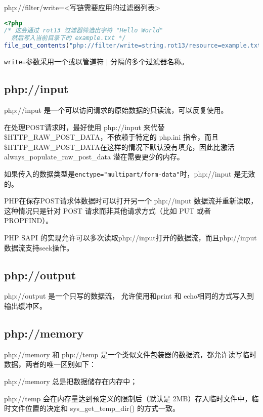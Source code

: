 \begin{example}
php://filter/write=<写链需要应用的过滤器列表>
\begin{lstlisting}[language=PHP]
<?php
/* 这会通过 rot13 过滤器筛选出字符 "Hello World"
  然后写入当前目录下的 example.txt */
file_put_contents("php://filter/write=string.rot13/resource=example.txt","Hello World");
\end{lstlisting}
\end{example}

\texttt{write=}参数采用一个或以管道符 | 分隔的多个过滤器名称。

\subsection{php://input}

php://input 是一个可以访问请求的原始数据的只读流，可以反复使用。 

在处理POST请求时，最好使用 php://input 来代替\$HTTP\_RAW\_POST\_DATA，不依赖于特定的 php.ini 指令，而且\$HTTP\_RAW\_POST\_DATA在这样的情况下默认没有填充，因此比激活 always\_populate\_raw\_post\_data 潜在需要更少的内存。

如果传入的数据类型是\texttt{enctype="multipart/form-data"}时，php://input 是无效的。

PHP在保存POST请求体数据时可以打开另一个 php://input 数据流并重新读取，这种情况只是针对 POST 请求而非其他请求方式（比如 PUT 或者 PROPFIND）。


PHP SAPI 的实现允许可以多次读取php://input打开的数据流，而且php://input数据流支持seek操作。


\subsection{php://output}

php://output 是一个只写的数据流， 允许使用和print 和 echo相同的方式写入到输出缓冲区。





\subsection{php://memory}

php://memory 和 php://temp 是一个类似文件包装器的数据流，都允许读写临时数据，两者的唯一区别如下：

\begin{compactitem}
\item php://memory 总是把数据储存在内存中；
\item php://temp 会在内存量达到预定义的限制后（默认是 2MB）存入临时文件中，临时文件位置的决定和 sys\_get\_temp\_dir() 的方式一致。
\end{compactitem}





